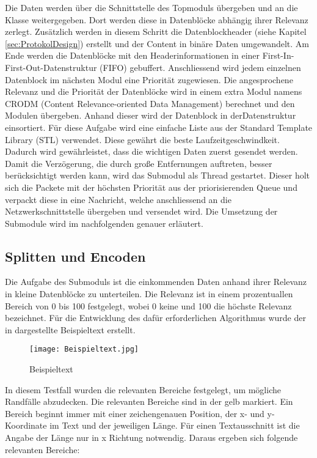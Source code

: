Die Daten werden über die Schnittstelle des Topmoduls übergeben und an die
Klasse  weitergegeben. Dort werden diese in Datenblöcke
abhängig ihrer Relevanz zerlegt. Zusätzlich werden in diesem Schritt die
Datenblockheader (siehe Kapitel \ref{sec:ProtokolDesign}) erstellt und der
Content in binäre Daten umgewandelt. Am Ende werden die Datenblöcke mit den
Headerinformationen in einer First-In-First-Out-Datenstruktur (FIFO)
gebuffert.
Anschliessend wird jedem einzelnen Datenblock im nächsten Modul eine Priorität zugewiesen. Die angesprochene
Relevanz und die Priorität der Datenblöcke wird in einem extra Modul namens
CRODM (Content Relevance-oriented Data Management)
berechnet und den Modulen übergeben.
Anhand dieser wird der Datenblock in derDatenstruktur
 einsortiert. Für diese Aufgabe wird eine einfache
Liste aus der Standard Template Library (STL) verwendet.
Diese gewährt die beste Laufzeitgeschwindkeit. Dadurch wird gewährleistet, dass die wichtigen
Daten zuerst gesendet werden.
Damit die Verzögerung, die durch große Entfernungen auftreten, besser
berücksichtigt werden kann, wird das Submodul  als Thread
gestartet.
Dieser holt sich die Packete mit der höchsten Priorität aus der priorisierenden Queue
und verpackt diese in eine Nachricht, welche anschliessend an die
Netzwerkschnittstelle übergeben und versendet wird. \newline
Die Umsetzung der Submodule wird im nachfolgenden genauer erläutert.

\subsection{Splitten und Encoden}

Die Aufgabe des Submoduls  ist die einkommenden Daten
anhand ihrer Relevanz in kleine Datenblöcke zu unterteilen. Die Relevanz ist
in einem prozentuallen Bereich von 0 bis 100 festgelegt, wobei 0 keine und 100
die höchste Relevanz bezeichnet. Für die Entwicklung des dafür erforderlichen
Algorithmus wurde der in  dargestellte Beispieltext
erstellt.

\begin{figure}[H]
\centering
\texttt{[image: Beispieltext.jpg]} %
\caption{Beispieltext}
\label{fig:Beispieltext}
\end{figure}

In diesem Testfall wurden die relevanten Bereiche festgelegt, um mögliche
Randfälle abzudecken. Die relevanten Bereiche sind in
der  gelb markiert.
Ein Bereich beginnt immer mit einer zeichengenauen Position, der x- und
y-Koordinate im Text und der jeweiligen Länge. Für einen Textausschnitt ist die
Angabe der Länge nur in x Richtung notwendig. \newline
Daraus ergeben sich folgende relevanten Bereiche:


